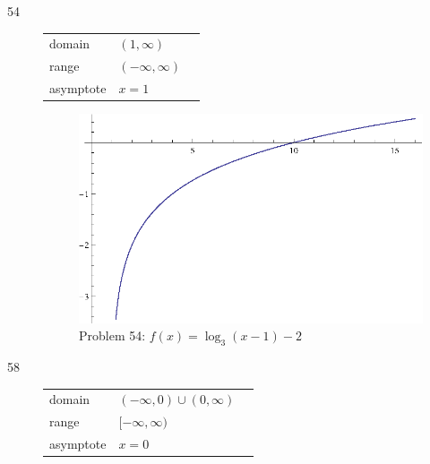 \documentclass{exam}
\begin{document}
\begin{description}
    \item[54]
      \begin{tabular}[H]{lll}
        \toprule
        domain    & $(1, \infty)$ \\
        range     & $(-\infty, \infty)$ \\
        asymptote & $x = 1$ \\
        \bottomrule
      \end{tabular}

      \begin{figure}[H]
        \centering
        \includegraphics[scale = 0.9]{problem54.eps}
        \caption{Problem 54: $f(x) = \log_3(x - 1) - 2$}
      \end{figure}



    \item[58]
      \begin{tabular}[H]{lll}
        \toprule
        domain    & $(-\infty, 0) \cup (0, \infty)$ \\
        range     & $[-\infty, \infty)$ \\
        asymptote & $x = 0$ \\
        \bottomrule
      \end{tabular}


\end{description}
\end{document}
